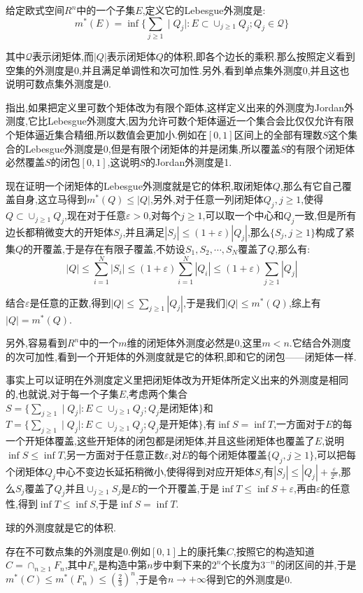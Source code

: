 给定欧式空间$R^n$中的一个子集$E$,定义它的Lebesgue外测度是:
$$m^*(E)=\inf\{\sum_{j\ge1}\mid Q_j\mid:E\subset\cup_{j\ge1}Q_j;Q_j\in\mathscr{Q}\}$$

其中$\mathscr{Q}$表示闭矩体,而$|Q|$表示闭矩体$Q$的体积,即各个边长的乘积.那么按照定义看到空集的外测度是0,并且满足单调性和次可加性.另外,看到单点集外测度0,并且这也说明可数点集外测度是0.

指出,如果把定义里可数个矩体改为有限个距体,这样定义出来的外测度为Jordan外测度,它比Lebesgue外测度大,因为允许可数个矩体逼近一个集合会比仅仅允许有限个矩体逼近集合精细,所以数值会更加小.例如在$[0,1]$区间上的全部有理数$S$这个集合的Lebesgue外测度是0,但是有限个闭矩体的并是闭集,所以覆盖$S$的有限个闭矩体必然覆盖$S$的闭包$[0,1]$,这说明$S$的Jordan外测度是1.

现在证明一个闭矩体的Lebesgue外测度就是它的体积,取闭矩体$Q$,那么有它自己覆盖自身,这立马得到$m^*(Q)\le |Q|$,另外,对于任意一列闭矩体$Q_j,j\ge1$,使得$Q\subset\cup_{j\ge1}Q_j$,现在对于任意$\varepsilon>0$,对每个$j\ge1$,可以取一个中心和$Q_j$一致,但是所有边长都稍微变大的开矩体$S_j$,并且满足$|S_j|\le(1+\varepsilon)|Q_j|$,那么$\{S_j,j\ge1\}$构成了紧集$Q$的开覆盖,于是存在有限子覆盖,不妨设$S_1,S_2,\cdots,S_N$覆盖了$Q$,那么有:
$$|Q|\le\sum_{i=1}^{N}|S_i|\le(1+\varepsilon)\sum_{i=1}^N|Q_i|\le(1+\varepsilon)\sum_{j\ge1}|Q_j|$$

结合$\varepsilon$是任意的正数,得到$|Q|\le\sum_{j\ge1}|Q_j|$,于是我们$|Q|\le m^*(Q)$,综上有$|Q|=m^*(Q)$.

另外,容易看到$R^n$中的一个$m$维的闭矩体外测度必然是0,这里$m<n$.它结合外测度的次可加性,看到一个开矩体的外测度就是它的体积,即和它的闭包——闭矩体一样.

事实上可以证明在外测度定义里把闭矩体改为开矩体所定义出来的外测度是相同的,也就说,对于每一个子集$E$,考虑两个集合$S=\{\sum_{j\ge1}\mid Q_j\mid:E\subset\cup_{j\ge1}Q_j;Q_j\text{是闭矩体}\}$和$T=\{\sum_ {j\ge1}\mid Q_j\mid:E\subset\cup_{j\ge1}Q_j;Q_j\text{是开矩体}\}$,有$\inf S=\inf T$,一方面对于$E$的每一个开矩体覆盖,这些开矩体的闭包都是闭矩体,并且这些闭矩体也覆盖了$E$,说明$\inf S\le \inf T$,另一方面对于任意正数$\varepsilon$,对$E$的每个闭矩体覆盖$\{Q_j,j\ge1\}$,可以把每个闭矩体$Q_j$中心不变边长延拓稍微小,使得得到对应开矩体$S_j$有$|S_j|\le|Q_j|+\frac{\varepsilon}{2^n}$,那么$S_j$覆盖了$Q_j$并且$\cup_{j\ge1}S_j$是$E$的一个开覆盖,于是$\inf T\le\inf S+\varepsilon$,再由$\varepsilon$的任意性,得到$\inf T\le\inf S$,于是$\inf S=\inf T$.

球的外测度就是它的体积.

存在不可数点集的外测度是0.例如$[0,1]$上的康托集$C$,按照它的构造知道$C=\cap_{n\ge1}F_n$,其中$F_n$是构造中第$n$步中剩下来的$2^n$个长度为$3^ {-n}$的闭区间的并,于是$m^*(C)\le m^*(F_n)\le\left(\frac{2}{3}\right)^n$,于是令$n\to+\infty$得到它的外测度是0.

